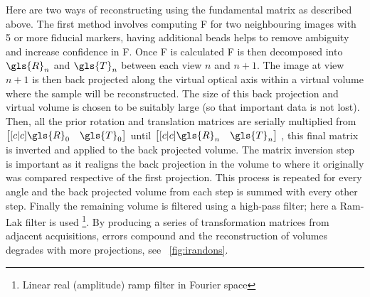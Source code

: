 Here are two ways of reconstructing using the \gls{fundamental matrix} as described above.
The first method involves computing \gls{F} for two neighbouring images with 5 or more fiducial markers, having additional beads helps to remove ambiguity and increase confidence in \gls{F}.
Once \gls{F} is calculated \gls{F} is then decomposed into \(\gls{R}_n\) and \(\gls{T}_n\) between each view \(n\) and \(n+1\).
The image at view \(n+1\) is then back projected along the virtual optical axis within a virtual volume where the sample will be reconstructed.
The size of this back projection and virtual volume is chosen to be suitably large (so that important data is not lost).
Then, all the prior rotation and translation matrices are serially multiplied from \(\begin{bmatrix}[c|c] \gls{R}_0&\gls{T}_0 \end{bmatrix}\) until \(\begin{bmatrix}[c|c] \gls{R}_n&\gls{T}_n \end{bmatrix}\) %
, this final matrix is inverted and applied to the back projected volume.
The matrix inversion step is important as it realigns the back projection in the volume to where it originally was compared respective of the first projection.
This process is repeated for every angle and the back projected volume from each step is summed with every other step.
Finally the remaining volume is filtered using a high-pass filter; here a \gls{Ram-Lak filter} is used
\footnote{Linear real (amplitude) ramp filter in Fourier space}.%
By producing a series of transformation matrices from adjacent acquisitions, errors compound and the reconstruction of volumes degrades with more projections, see \figurename~\ref{fig:irandons}.

